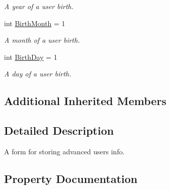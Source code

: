 \begin{DoxyCompactItemize}
\begin{DoxyCompactList}\small\item\em A year of a user birth. \end{DoxyCompactList}\item 
int \mbox{\hyperlink{class_wpf_handler_1_1_u_i_1_1_controls_1_1_logon_1_1_advanced_registration_panel_descriptor_a54f4881fa4b6fbfd0aa8baa93993523c}{Birth\+Month}} = 1
\begin{DoxyCompactList}\small\item\em A month of a user birth. \end{DoxyCompactList}\item 
int \mbox{\hyperlink{class_wpf_handler_1_1_u_i_1_1_controls_1_1_logon_1_1_advanced_registration_panel_descriptor_a30229eda915ba6cfdf9747e369f6afbe}{Birth\+Day}} = 1
\begin{DoxyCompactList}\small\item\em A day of a user birth. \end{DoxyCompactList}\end{DoxyCompactItemize}
\subsection*{Additional Inherited Members}


\subsection{Detailed Description}
A form for storing advanced user\textquotesingle{}s info. 



\subsection{Property Documentation}
\mbox{\label{class_wpf_handler_1_1_u_i_1_1_controls_1_1_logon_1_1_advanced_registration_panel_descriptor_a30229eda915ba6cfdf9747e369f6afbe}} 
